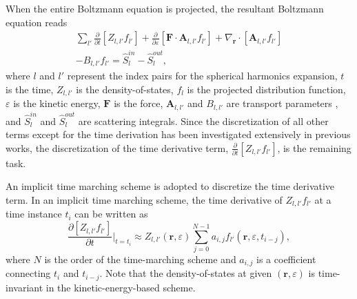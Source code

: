 \documentclass[journal]{IEEEtran}
\newcommand{\revision}[1]{{#1}}
\begin{document}
   When the entire Boltzmann equation is projected, the resultant Boltzmann equation reads \cite{Hong2009,Hong2011}
\begin{multline}
\label{eq_balance}
\sum_{l'}
\frac{\partial}{\partial t} \left[ Z_{l,l'} f_{l'} \right]
+ \frac{\partial}{\partial \varepsilon} \left[ \mathbf{F} \cdot \mathbf{A}_{l,l'} f_{l'} \right]
+ \nabla_{\mathbf{r}} \cdot \left[ \mathbf{A}_{l,l'} f_{l'} \right] \\
- B_{l,l'} f_{l'}
= \hat{S}_{l}^{in} - \hat{S}_{l}^{out},
\end{multline} 
where $l$ and $l'$ represent the index pairs for the spherical harmonics expansion, \revision{$t$ is the time,} $Z_{l,l'}$ is the density-of-states, $f_{l}$ is the projected distribution function, $\varepsilon$ is the kinetic energy, $\mathbf{F}$ is the force, $\mathbf{A}_{l,l'}$ and $B_{l,l'}$ are transport parameters \cite{Hong2011}, and $\hat{S}_{l}^{in}$ and $\hat{S}_{l}^{out}$ are scattering integrals.
   Since the discretization of all other terms except for the time derivation has been investigated extensively in previous works, the discretization of the time derivative term, $\frac{\partial}{\partial t} \left[ Z_{l,l'} f_{l'} \right]$, is the remaining task.

   An implicit time marching scheme is adopted to discretize the time derivative term.
   In an implicit time marching scheme, the time derivative of $Z_{l,l'} f_{l'}$ at a time instance $t_i$ can be written as 
\begin{equation}
\frac{\partial [ Z_{l,l'} f_{l'} ]}{\partial t} \Big|_{t=t_i} \approx Z_{l,l'}(\mathbf{r},\varepsilon) \sum_{j=0}^{N-1} a_{i,j} f_{l'}(\mathbf{r},\varepsilon,t_{i-j}),
\end{equation}
where $N$ is the order of the time-marching scheme and $a_{i,j}$ is a coefficient connecting $t_i$ and $t_{i-j}$. 
   Note that the density-of-states at given $(\mathbf{r},\varepsilon)$ is time-invariant in the kinetic-energy-based scheme. 
\end{document}
